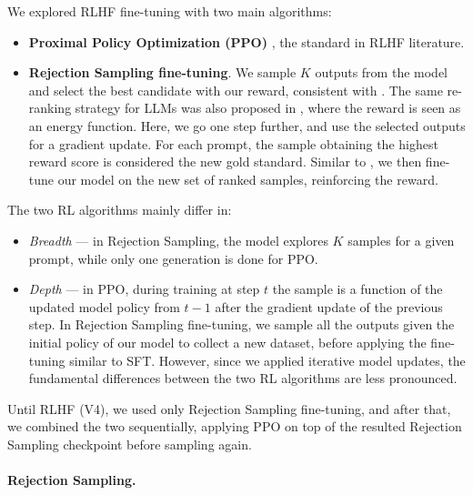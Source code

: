 \documentclass{article}
\begin{document}
We explored RLHF fine-tuning with two main algorithms: 
\begin{itemize}
    \item \textbf{Proximal Policy Optimization (PPO)} \citep{schulman2017proximal}, the standard in RLHF literature. 
    \item \textbf{Rejection Sampling fine-tuning}. We sample $K$ outputs from the model and select the best candidate with our reward, consistent with \cite{bai2022constitutional}. The same re-ranking strategy for LLMs was also proposed in \cite{deng2019residual}, where the reward is seen as an energy function. Here, we go one step further, and use the selected outputs for a gradient update. For each prompt, the sample obtaining the highest reward score is considered the new gold standard. Similar to \cite{pmlr-v119-scialom20a}, we then fine-tune our model on the new set of ranked samples, reinforcing the reward. 
\end{itemize}

The two RL algorithms mainly differ in:
\begin{itemize}
    \item \textit{Breadth} --- in Rejection Sampling, the model explores $K$ samples for a given prompt, while only one generation is done for PPO.
    \item \textit{Depth} --- in PPO, during training at step $t$ the sample is a function of the updated model policy from $t-1$ after the gradient update of the previous step. In Rejection Sampling fine-tuning, we sample all the outputs given the initial policy of our model to collect a new dataset, before applying the fine-tuning similar to SFT. However, since we applied iterative model updates, the fundamental differences between the two RL algorithms are less pronounced.
\end{itemize}

Until RLHF (V4), we used only Rejection Sampling fine-tuning, and after that, we combined the two sequentially, applying PPO on top of the resulted Rejection Sampling checkpoint before sampling again. 

\paragraph{Rejection Sampling.}
\end{document}
